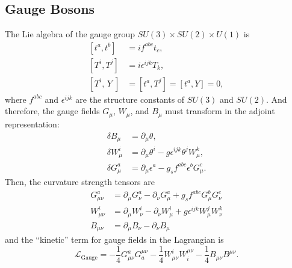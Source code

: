 \subsection{Gauge Bosons}

The Lie algebra of the gauge group $SU(3)\times SU(2)\times U(1)$ is
\begin{equation}
\begin{aligned}
	{\left[t^{a}, t^{b}\right] } &=i f^{a b c} t_{c}, \\
	{\left[T^{i}, T^{j}\right] } &=i \epsilon^{i j k} T_{k}, \\
	{\left[T^{i}, \, Y\;\right] } &=\left[t^{a}, T^{j}\right]=\left[t^{a}, Y\right]=0,
\end{aligned}
\end{equation}
where $f^{a b c}$ and $\epsilon^{i j k}$ are the structure constants of $SU(3)$ and $SU(2)$. And therefore, the gauge fields $G_\mu$, $W_\mu$, and $B_\mu$ must transform in the adjoint representation: 
\begin{equation}
	\begin{aligned}
		\delta B_{\mu} &=\partial_{\mu} \theta, \\
		\delta W_{\mu}^{i} &=\partial_{\mu} \theta^{i}-g \epsilon^{i j k} \theta^{j} W_{\mu}^{k}, \\
		\delta G_{\mu}^{a} &=\partial_{\mu} \epsilon^{a}-g_{s} f^{a b c} \epsilon^{b} G_{\mu}^{c}.
	\end{aligned}
\end{equation}
Then, the curvature strength tensors are
\begin{equation}\label{eq:field-strength-tensors}
\begin{aligned}
	G_{\mu \nu}^{a} &=\partial_{\mu} G_{\nu}^{a}-\partial_{\nu} G_{\mu}^{a}+g_{s} f^{a b c} G_{\mu}^{b} G_{\nu}^{c} \\
	W_{\mu \nu}^{i} &=\partial_{\mu} W_{\nu}^{i}-\partial_{\nu} W_{\mu}^{i}+g \epsilon^{i j k} W_{\mu}^{j} W_{\nu}^{k} \\
	B_{\mu \nu} &=\partial_{\mu} B_{\nu}-\partial_{\nu} B_{\mu}
\end{aligned}
\end{equation}
and the ``kinetic'' term for gauge fields in the Lagrangian is  
\begin{equation}\label{eq:gauge-lagrangian}
\mathcal{L}_{\text{Gauge}}=-\frac{1}{4} G_{\mu \nu}^{a} G_{a}^{\mu \nu}-\frac{1}{4} W_{\mu \nu}^{i} W_{i}^{\mu \nu}-\frac{1}{4} B_{\mu \nu} B^{\mu \nu}.
\end{equation}
%

